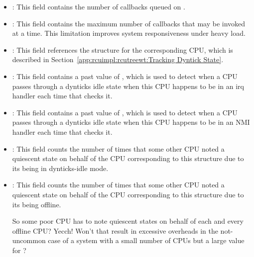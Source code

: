 \begin{itemize}
\item	{}:
	This field contains the number of callbacks queued on
	.
\item	{}:
	This field contains the maximum number of callbacks that may
	be invoked at a time.
	This limitation improves system responsiveness under heavy load.
\item	{}:
	This field references the  structure for
	the corresponding CPU, which is described in
	Section~\ref{app:rcuimpl:rcutreewt:Tracking Dyntick State}.
\item	{}:
	This field contains a past value of ,
	which is used to detect when a CPU passes through a dynticks
	idle state when this CPU happens to be in an irq
	handler each time that  checks it.
\item	{}:
	This field contains a past value of ,
	which is used to detect when a CPU passes through a dynticks
	idle state when this CPU happens to be in an NMI
	handler each time that  checks it.
\item	{}:
	This field counts the number of times that some other CPU noted
	a quiescent state on behalf of
	the CPU corresponding to this  structure due to
	its being in dynticks-idle mode.
\item	{}:
	This field counts the number of times that some other CPU noted
	a quiescent state on behalf of
	the CPU corresponding to this  structure due to
	its being offline.

\QuickQuiz{}
	So some poor CPU has to note quiescent states on behalf of
	each and every offline CPU?
	Yecch!
	Won't that result in excessive overheads in the not-uncommon
	case of a system with a small number of CPUs but a large value
	for ?
 \QuickQuizEnd


\end{itemize}
